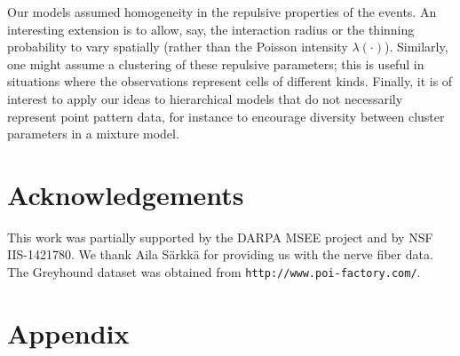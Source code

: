 \documentclass{statsoc}
\begin{document}
Our models assumed homogeneity in the repulsive properties of the \matern events. An interesting extension is to allow, say, the interaction radius or 
the thinning probability to vary spatially (rather than the Poisson intensity $\lambda(\cdot)$). 
Similarly, one might assume a clustering of these repulsive parameters; %
this is useful in situations where the \matern observations represent cells of different kinds. 
Finally, it is of interest to apply our ideas to hierarchical models that do not necessarily represent point pattern data, for instance to encourage diversity between cluster parameters in a mixture model.


\section{Acknowledgements}
This work was partially supported by the DARPA MSEE project and by NSF IIS-1421780. We thank Aila S{\"a}rkk{\"a} for providing us with the nerve fiber data. The Greyhound dataset
was obtained from \texttt{http://www.poi-factory.com/}.
\appendix
\section{Appendix}

\setcounter{defn}{1}
\end{document}
